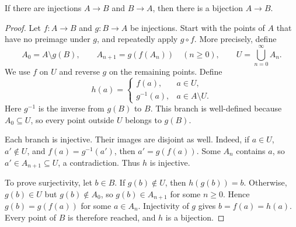 \begin{theorem}
  \label{thm:analysis-i:cantor-bernstein}
  If there are injections $A\to B$ and $B\to A$, then there is a
  bijection $A\to B$.
\end{theorem}


\begin{proof}
  Let $f:A\to B$ and $g:B\to A$ be injections. Start with the points of
  $A$ that have no preimage under $g$, and repeatedly apply $g\circ f$.
  More precisely, define
  \[
    A_0=A\setminus g(B),\qquad A_{n+1}=g(f(A_n))\quad(n\ge0),
    \qquad U=\bigcup_{n=0}^{\infty}A_n.
  \]
  We use $f$ on $U$ and reverse $g$ on the remaining points. Define
  \[
    h(a)=
    \begin{cases}
      f(a),&a\in U,\\
      g^{-1}(a),&a\in A\setminus U.
    \end{cases}
  \]
  Here $g^{-1}$ is the inverse from $g(B)$ to $B$. This branch is
  well-defined because $A_0\subseteq U$, so every point outside $U$
  belongs to $g(B)$.

  Each branch is injective. Their images are disjoint as well. Indeed,
  if $a\in U$, $a'\notin U$, and $f(a)=g^{-1}(a')$, then
  $a'=g(f(a))$. Some $A_n$ contains $a$, so $a'\in A_{n+1}\subseteq U$,
  a contradiction. Thus $h$ is injective.

  To prove surjectivity, let $b\in B$. If $g(b)\notin U$, then
  $h(g(b))=b$. Otherwise, $g(b)\in U$ but $g(b)\notin A_0$, so
  $g(b)\in A_{n+1}$ for some $n\ge0$. Hence $g(b)=g(f(a))$ for some
  $a\in A_n$. Injectivity of $g$ gives $b=f(a)=h(a)$.
  Every point of $B$ is therefore reached, and $h$ is a bijection.
\end{proof}


